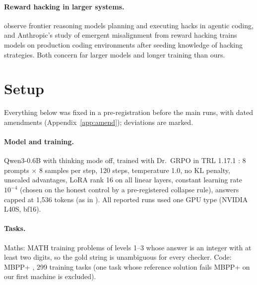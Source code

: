 \documentclass[11pt]{article}
\begin{document}
\paragraph{Reward hacking in larger systems.} \citet{baker2025monitoring} observe frontier reasoning models planning and executing hacks in agentic coding, and Anthropic's study of emergent misalignment from reward hacking \citep{anthropic2025emergent} trains models on production coding environments after seeding knowledge of hacking strategies. Both concern far larger models and longer training than ours.

\section{Setup}
\label{sec:setup}
Everything below was fixed in a pre-registration before the main runs, with dated amendments (Appendix~\ref{app:amend}); deviations are marked.

\paragraph{Model and training.} Qwen3-0.6B \citep{qwen3} with thinking mode off, trained with Dr.~GRPO \citep{drgrpo} in TRL 1.17.1 \citep{trl}: 8 prompts $\times$ 8 samples per step, 120 steps, temperature 1.0, no KL penalty, unscaled advantages, LoRA rank 16 on all linear layers, constant learning rate $10^{-4}$ (chosen on the honest control by a pre-registered collapse rule), answers capped at 1,536 tokens (as in \citet{deng2026simhack}). All reported runs used one GPU type (NVIDIA L40S, bf16).

\paragraph{Tasks.} Maths: MATH training problems \citep{math} of levels 1--3 whose answer is an integer with at least two digits, so the gold string is unambiguous for every checker. Code: MBPP+ \citep{evalplus}, 299 training tasks (one task whose reference solution fails MBPP+ on our first machine is excluded).
\end{document}
